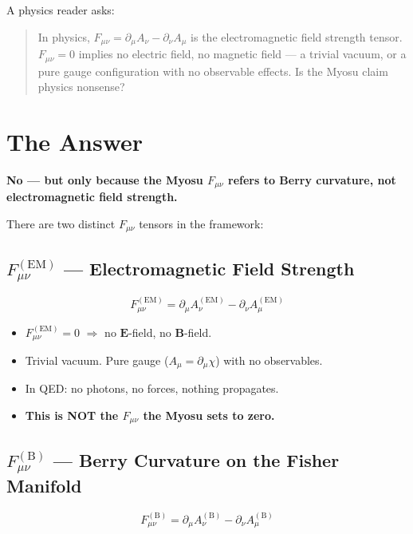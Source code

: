 \documentclass[12pt,a4paper]{article}
\begin{document}
A physics reader asks:

\begin{quote}
In physics, $F_{\mu\nu} = \partial_\mu A_\nu - \partial_\nu A_\mu$ is the electromagnetic field strength tensor. $F_{\mu\nu} = 0$ implies no electric field, no magnetic field — a trivial vacuum, or a pure gauge configuration with no observable effects. Is the Myosu claim physics nonsense?
\end{quote}

\section{The Answer}

\noindent\textbf{No — but only because the Myosu $F_{\mu\nu}$ refers to Berry curvature, not electromagnetic field strength.}

There are two distinct $F_{\mu\nu}$ tensors in the framework:

\subsection{$F_{\mu\nu}^{(\mathrm{EM})}$ — Electromagnetic Field Strength}

\begin{equation}
F_{\mu\nu}^{(\mathrm{EM})} = \partial_\mu A_\nu^{(\mathrm{EM})} - \partial_\nu A_\mu^{(\mathrm{EM})}
\label{eq:em}
\end{equation}

\begin{itemize}[nosep]
    \item $F_{\mu\nu}^{(\mathrm{EM})} = 0$ $\Rightarrow$ no $\mathbf{E}$-field, no $\mathbf{B}$-field.
    \item Trivial vacuum. Pure gauge ($A_\mu = \partial_\mu \chi$) with no observables.
    \item In QED: no photons, no forces, nothing propagates.
    \item \textbf{This is NOT the $F_{\mu\nu}$ the Myosu sets to zero.}
\end{itemize}

\subsection{$F_{\mu\nu}^{(\mathrm{B})}$ — Berry Curvature on the Fisher Manifold}

\begin{equation}
F_{\mu\nu}^{(\mathrm{B})} = \partial_\mu A_\nu^{(\mathrm{B})} - \partial_\nu A_\mu^{(\mathrm{B})}
\label{eq:berry}
\end{equation}
\end{document}
